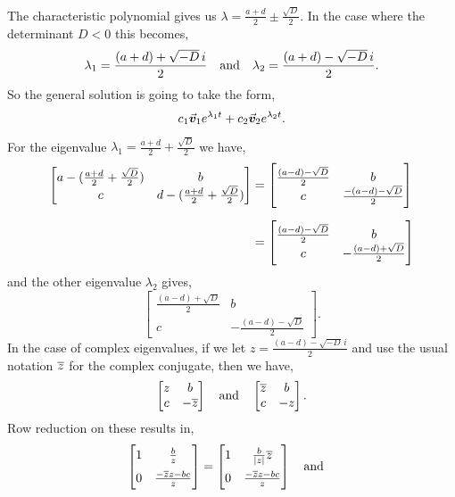 \documentclass[../MathsNotesBase.tex]{subfiles}
\begin{document}
{		The characteristic polynomial gives us ${ \lambda = \frac{a+d}{2} \pm \frac{\sqrt{D}}{2} }$. In the case where the determinant ${ D < 0 }$ this becomes,
		\[ \lambda_1 = \frac{(a+d) + \sqrt{-D} \, i}{2} \hspace{10pt}\text{and}\hspace{10pt} \lambda_2 = \frac{(a+d) - \sqrt{-D} \, i}{2}. \]
		So the general solution is going to take the form,
		\[ c_1 \vec{\bm{v}}_1 e^{\lambda_1 t} + c_2 \vec{\bm{v}}_2 e^{\lambda_2 t}. \]

		For the eigenvalue ${ \lambda_1 = \frac{a+d}{2} + \frac{\sqrt{D}}{2} }$ we have,
		\[\begin{aligned}
			\begin{bmatrix}
				a - (\frac{a+d}{2} + \frac{\sqrt{D}}{2}) & b\\
				c & d - (\frac{a+d}{2} + \frac{\sqrt{D}}{2})
			\end{bmatrix} &=
			\begin{bmatrix}
				\frac{(a-d) - \sqrt{D}}{2} & b\\
				c & \frac{-(a-d) - \sqrt{D}}{2}
			\end{bmatrix} \nn
			&= \begin{bmatrix}
					\frac{(a-d) - \sqrt{D}}{2} & b\\
					c & -\frac{(a-d) + \sqrt{D}}{2}
				\end{bmatrix} \\
		\end{aligned}\]
		and the other eigenvalue $\lambda_2$ gives,
		\[ 
			\begin{bmatrix}
				\frac{(a-d) + \sqrt{D}}{2} & b\\
				c & -\frac{(a-d) - \sqrt{D}}{2}
			\end{bmatrix}.
		\]
		In the case of complex eigenvalues, if we let ${ z = \frac{(a-d) - \sqrt{-D}\, i}{2} }$ and use the usual notation $\overline{z}$ for the complex conjugate, then we have,
		\[
			\begin{bmatrix}
				z & b\\
				c & -\overline{z}
			\end{bmatrix} \hspace{10pt}\text{and}\hspace{10pt}
			\begin{bmatrix}
				\overline{z} & b\\
				c & -z
			\end{bmatrix}.
		\]
		Row reduction on these results in,
		\[
			\begin{bmatrix}
				1 & \frac{b}{z} \nn
				0 & \frac{-\conj{z}z - bc}{z}
			\end{bmatrix} =
			\begin{bmatrix}
				1 & \frac{b}{\abs{z}}\conj{z} \nn
				0 & \frac{-\conj{z}z - bc}{z}
			\end{bmatrix} \eqand
\]}
\end{document}
